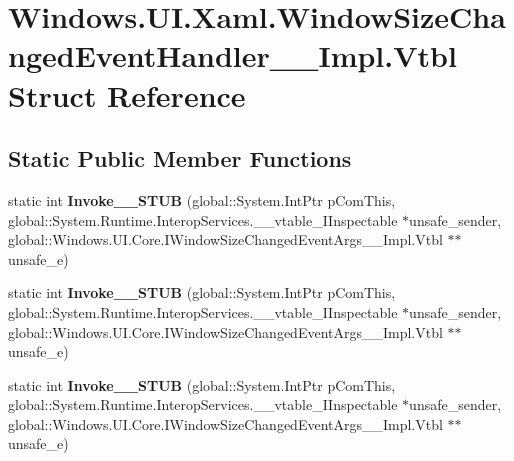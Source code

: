 \hypertarget{struct_windows_1_1_u_i_1_1_xaml_1_1_window_size_changed_event_handler_____impl_1_1_vtbl}{}\section{Windows.\+U\+I.\+Xaml.\+Window\+Size\+Changed\+Event\+Handler\+\_\+\+\_\+\+Impl.\+Vtbl Struct Reference}
\label{struct_windows_1_1_u_i_1_1_xaml_1_1_window_size_changed_event_handler_____impl_1_1_vtbl}
\subsection*{Static Public Member Functions}
\begin{DoxyCompactItemize}
\item 
\mbox{\label{struct_windows_1_1_u_i_1_1_xaml_1_1_window_size_changed_event_handler_____impl_1_1_vtbl_a56151f43d05bc5f0a5da74ca82b77bd2}} 
static int {\bfseries Invoke\+\_\+\+\_\+\+S\+T\+UB} (global\+::\+System.\+Int\+Ptr p\+Com\+This, global\+::\+System.\+Runtime.\+Interop\+Services.\+\_\+\+\_\+vtable\+\_\+\+I\+Inspectable $\ast$unsafe\+\_\+sender, global\+::\+Windows.\+U\+I.\+Core.\+I\+Window\+Size\+Changed\+Event\+Args\+\_\+\+\_\+\+Impl.\+Vtbl $\ast$$\ast$unsafe\+\_\+e)
\item 
\mbox{\label{struct_windows_1_1_u_i_1_1_xaml_1_1_window_size_changed_event_handler_____impl_1_1_vtbl_a56151f43d05bc5f0a5da74ca82b77bd2}} 
static int {\bfseries Invoke\+\_\+\+\_\+\+S\+T\+UB} (global\+::\+System.\+Int\+Ptr p\+Com\+This, global\+::\+System.\+Runtime.\+Interop\+Services.\+\_\+\+\_\+vtable\+\_\+\+I\+Inspectable $\ast$unsafe\+\_\+sender, global\+::\+Windows.\+U\+I.\+Core.\+I\+Window\+Size\+Changed\+Event\+Args\+\_\+\+\_\+\+Impl.\+Vtbl $\ast$$\ast$unsafe\+\_\+e)
\item 
\mbox{\label{struct_windows_1_1_u_i_1_1_xaml_1_1_window_size_changed_event_handler_____impl_1_1_vtbl_a56151f43d05bc5f0a5da74ca82b77bd2}} 
static int {\bfseries Invoke\+\_\+\+\_\+\+S\+T\+UB} (global\+::\+System.\+Int\+Ptr p\+Com\+This, global\+::\+System.\+Runtime.\+Interop\+Services.\+\_\+\+\_\+vtable\+\_\+\+I\+Inspectable $\ast$unsafe\+\_\+sender, global\+::\+Windows.\+U\+I.\+Core.\+I\+Window\+Size\+Changed\+Event\+Args\+\_\+\+\_\+\+Impl.\+Vtbl $\ast$$\ast$unsafe\+\_\+e)
$$
\end{DoxyCompactItemize}
